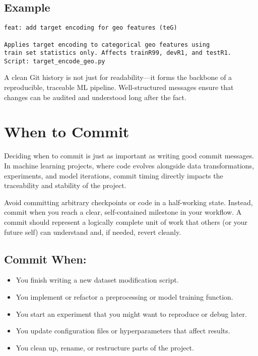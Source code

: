 \documentclass[12pt,openany]{book}
\begin{document}
\subsection*{Example}

\begin{verbatim}
feat: add target encoding for geo features (teG)

Applies target encoding to categorical geo features using
train set statistics only. Affects trainR99, devR1, and testR1.
Script: target_encode_geo.py
\end{verbatim}

A clean Git history is not just for readability—it forms the backbone of a reproducible, traceable ML pipeline. Well-structured messages ensure that changes can be audited and understood long after the fact.



\section{When to Commit}

Deciding when to commit is just as important as writing good commit messages. In machine learning projects, where code evolves alongside data transformations, experiments, and model iterations, commit timing directly impacts the traceability and stability of the project. \newline

Avoid committing arbitrary checkpoints or code in a half-working state. Instead, commit when you reach a clear, self-contained milestone in your workflow. A commit should represent a logically complete unit of work that others (or your future self) can understand and, if needed, revert cleanly.

\subsection*{Commit When:}
\begin{itemize}
    \item You finish writing a new dataset modification script.
    \item You implement or refactor a preprocessing or model training function.
    \item You start an experiment that you might want to reproduce or debug later.
    \item You update configuration files or hyperparameters that affect results.
    \item You clean up, rename, or restructure parts of the project.
\end{itemize}
\end{document}

